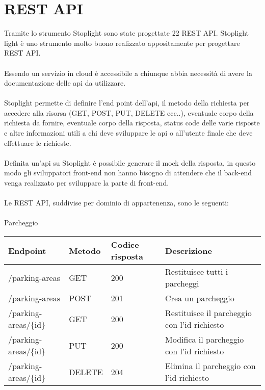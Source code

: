\section{REST API}
Tramite lo strumento Stoplight sono state progettate 22 REST API. Stoplight light è uno strumento molto buono realizzato
appositamente per progettare REST API.
\\\\
Essendo un servizio in cloud è accessibile a chiunque abbia necessità di avere la documentazione delle api da utilizzare.
\\\\
Stoplight permette di definire l'end point dell'api, il metodo della richiesta per accedere alla risorsa (GET, POST, PUT, DELETE ecc..),
eventuale corpo della richiesta da fornire, eventuale corpo della risposta, status code delle varie risposte e altre informazioni
utili a chi deve sviluppare le api o all'utente finale che deve effettuare le richieste.
\\\\
Definita un'api su Stoplight è possibile generare il mock della risposta, in questo modo gli sviluppatori front-end non hanno bisogno
di attendere che il back-end venga realizzato per sviluppare la parte di front-end.
\\\\
Le REST API, suddivise per dominio di appartenenza, sono le seguenti:
\\\\
Parcheggio
\\
\begin{table}
    \begin{tabular}{|p{3.2cm}|p{1.4cm}|p{1.3cm}|p{5.8cm}|} 
    \hline
    Endpoint & Metodo & Codice risposta & Descrizione \\ 
    \hline
    /parking-areas & GET & 200 & Restituisce tutti i parcheggi \\ 
    \hline
    /parking-areas & POST & 201 & Crea un parcheggio \\ 
    \hline
    /parking-areas/\{id\} & GET & 200 & Restituisce il parcheggio con l'id richiesto \\ 
    \hline
    /parking-areas/\{id\} & PUT & 200 & Modifica il parcheggio con l'id richiesto \\ 
    \hline
    /parking-areas/\{id\} & DELETE & 204 & Elimina il parcheggio con l'id richiesto \\ 
    \hline
    \end{tabular}
\end{table}
